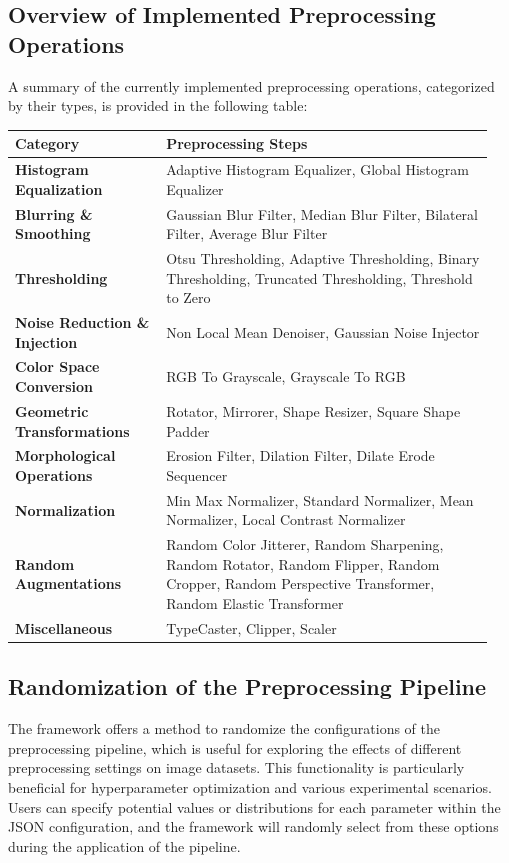 \documentclass[journal ]{new-aiaa}
\begin{document}
\subsection{Overview of Implemented Preprocessing Operations}
A summary of the currently implemented preprocessing operations, categorized by their types, is provided in the following table:

\begin{longtable}{|p{0.3\linewidth}|p{0.65\linewidth}|}
    \hline
    \textbf{Category} & \textbf{Preprocessing Steps} \\
    \hline
    \endhead
    \hline
    \endfoot
    
    \textbf{Histogram Equalization} & Adaptive Histogram Equalizer, Global Histogram Equalizer \\
    \hline
    \textbf{Blurring \& Smoothing} & Gaussian Blur Filter, Median Blur Filter, Bilateral Filter, Average Blur Filter \\
    \hline
    \textbf{Thresholding} & Otsu Thresholding, Adaptive Thresholding, Binary Thresholding, Truncated Thresholding, Threshold to Zero \\
    \hline
    \textbf{Noise Reduction \& Injection} & Non Local Mean Denoiser, Gaussian Noise Injector \\
    \hline
    \textbf{Color Space Conversion} & RGB To Grayscale, Grayscale To RGB \\
    \hline
    \textbf{Geometric Transformations} & Rotator, Mirrorer, Shape Resizer, Square Shape Padder \\
    \hline
    \textbf{Morphological Operations} & Erosion Filter, Dilation Filter, Dilate Erode Sequencer \\
    \hline
    \textbf{Normalization} & Min Max Normalizer, Standard Normalizer, Mean Normalizer, Local Contrast Normalizer \\
    \hline
    \textbf{Random Augmentations} & Random Color Jitterer, Random Sharpening, Random Rotator, Random Flipper, Random Cropper, Random Perspective Transformer, Random Elastic Transformer \\
    \textbf{Miscellaneous} & TypeCaster, Clipper, Scaler \\
    \hline
\end{longtable}

\subsection{Randomization of the Preprocessing Pipeline}
The framework offers a method to randomize the configurations of the preprocessing pipeline, which is useful for exploring the effects of different preprocessing settings on image datasets. This functionality is particularly beneficial for hyperparameter optimization and various experimental scenarios. Users can specify potential values or distributions for each parameter within the JSON configuration, and the framework will randomly select from these options during the application of the pipeline.
\end{document}
